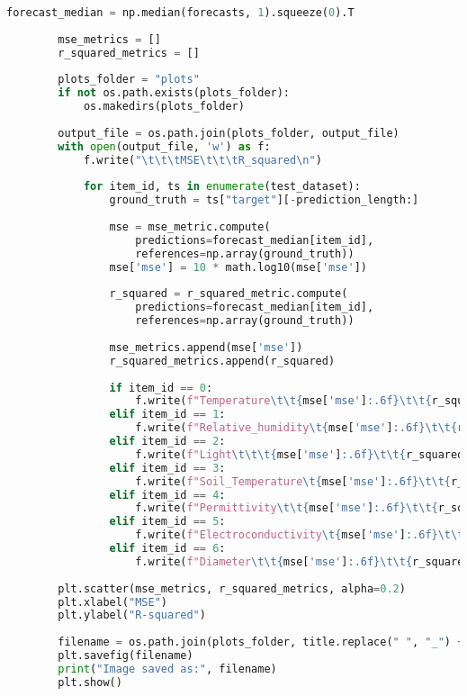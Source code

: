 \begin{lstlisting}[language=Python, caption={Code for evaluating the model’s performance}, breaklines=true, label=code6]
        forecast_median = np.median(forecasts, 1).squeeze(0).T
    
        mse_metrics = []
        r_squared_metrics = []
    
        plots_folder = "plots"
        if not os.path.exists(plots_folder):
            os.makedirs(plots_folder)
    
        output_file = os.path.join(plots_folder, output_file)
        with open(output_file, 'w') as f:
            f.write("\t\t\tMSE\t\t\tR_squared\n")
    
            for item_id, ts in enumerate(test_dataset):
                ground_truth = ts["target"][-prediction_length:]
    
                mse = mse_metric.compute(
                    predictions=forecast_median[item_id],
                    references=np.array(ground_truth))
                mse['mse'] = 10 * math.log10(mse['mse'])
    
                r_squared = r_squared_metric.compute(
                    predictions=forecast_median[item_id],
                    references=np.array(ground_truth))
    
                mse_metrics.append(mse['mse'])
                r_squared_metrics.append(r_squared)
    
                if item_id == 0:
                    f.write(f"Temperature\t\t{mse['mse']:.6f}\t\t{r_squared:.6f}\n")
                elif item_id == 1:
                    f.write(f"Relative_humidity\t{mse['mse']:.6f}\t\t{r_squared:.6f}\n")
                elif item_id == 2:
                    f.write(f"Light\t\t\t{mse['mse']:.6f}\t\t{r_squared:.6f}\n")
                elif item_id == 3:
                    f.write(f"Soil_Temperature\t{mse['mse']:.6f}\t\t{r_squared:.6f}\n")
                elif item_id == 4:
                    f.write(f"Permittivity\t\t{mse['mse']:.6f}\t\t{r_squared:.6f}\n")
                elif item_id == 5:
                    f.write(f"Electroconductivity\t{mse['mse']:.6f}\t\t{r_squared:.6f}\n")
                elif item_id == 6:
                    f.write(f"Diameter\t\t{mse['mse']:.6f}\t\t{r_squared:.6f}\n")
    
        plt.scatter(mse_metrics, r_squared_metrics, alpha=0.2)
        plt.xlabel("MSE")
        plt.ylabel("R-squared")
    
        filename = os.path.join(plots_folder, title.replace(" ", "_") + ".png")
        plt.savefig(filename)
        print("Image saved as:", filename)
        plt.show()
    

\end{lstlisting}
